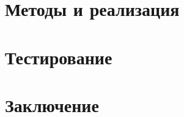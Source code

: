 \documentclass{spbau-diploma}
\begin{document}
\section{Методы и реализация}


\clearpage
\section{Тестирование}


\section*{Заключение}




\end{document}
